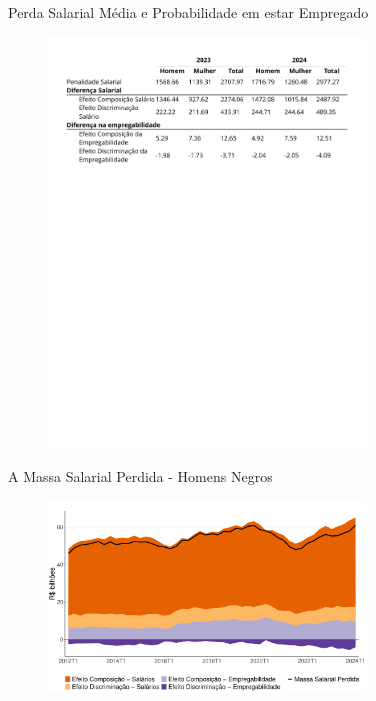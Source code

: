 \documentclass[10pt, xcolor=x11names,compress]{beamer}
\begin{document}
		\begin{frame}{ Perda Salarial Média e Probabilidade em estar Empregado}
		\begin{figure}
			\centering
			\includegraphics[width = 0.75\textwidth]{tables_output/table_individual.pdf}
		\end{figure}
		\end{frame}	
		
	\begin{frame}{A Massa Salarial Perdida - Homens Negros}
	\begin{figure}
		\centering
			\includegraphics[width = 0.75\textwidth]{figures_output/homem_negro_massa_perdida_gph.pdf}
	\end{figure}
	\end{frame}	
	
\end{document}
